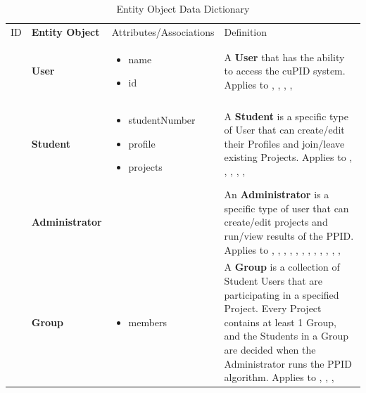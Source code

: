 \documentclass[12pt,letterpaper]{article}
\begin{document}
\begin{table}[H]
	\caption{Entity Object Data Dictionary}
	\begin{tabu} to 
		\tableheader{}ID & Entity Object & Attributes/\newline Associations & Definition\\
		 & User & 
		\begin{minipage}[t]{\linewidth}
			\begin{itemize}
				\item name
				\item id
			\end{itemize}
		\end{minipage} & 
		A \textbf{User} that has the ability to access the cuPID system. Applies to , , , ,  \\
		
		 & Student & 
		\begin{minipage}[t]{\linewidth}
			\begin{itemize}
				\item studentNumber
				\item profile
				\item projects
			\end{itemize}
		\end{minipage} & 
		A \textbf{Student} is a specific type of User that can create/edit their Profiles and join/leave existing Projects. Applies to , , , , ,  \\
		
		 & Administrator & 
		&
		An \textbf{Administrator} is a specific type of user that can create/edit projects and run/view results of the PPID. Applies to , , , , , , , , , , , ,  \\

		 & Group & 
		\begin{minipage}[t]{\linewidth}
			\begin{itemize}
				\item members
			\end{itemize}
		\end{minipage} & 
		A \textbf{Group} is a collection of Student Users that are participating in a specified Project. Every Project contains at least 1 Group, and the Students in a Group are decided when the Administrator runs the PPID algorithm. Applies to , , ,  \\


\end{tabu}
\end{table}
\end{document}

